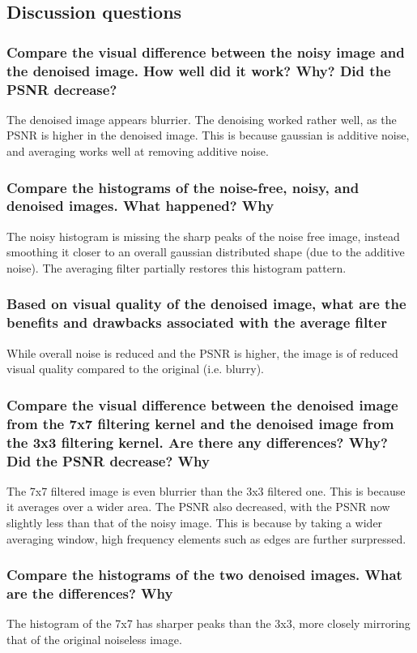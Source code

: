 \documentclass[article, 1.5space, letterpaper, 12pt, oneside, header, footer]{SydeClass}
\begin{document}
\clearpage


\subsection{Discussion questions}

\subsubsection{Compare the visual difference between the noisy image and the denoised image. How well did it
work? Why? Did the PSNR decrease?}
The denoised image appears blurrier. The denoising worked rather well, as the PSNR is higher in the denoised image. This is because gaussian is additive noise, and averaging works well at removing additive noise.

\subsubsection{Compare the histograms of the noise-free, noisy, and denoised images. What happened? Why}
The noisy histogram is missing the sharp peaks of the noise free image, instead smoothing it closer to an overall gaussian distributed shape (due to the additive noise). The averaging filter partially restores this histogram pattern.


\subsubsection{Based on visual quality of the denoised image, what are the benefits and drawbacks associated with
the average filter}
While overall noise is reduced and the PSNR is higher, the image is of reduced visual quality compared to the original (i.e. blurry).


\subsubsection{Compare the visual difference between the denoised image from the 7x7 filtering kernel and the
denoised image from the 3x3 filtering kernel. Are there any differences? Why? Did the PSNR
decrease? Why}
The 7x7 filtered image is even blurrier than the 3x3 filtered one. This is because it averages over a wider area. The PSNR also decreased, with the PSNR now slightly less than that of the noisy image. This is because by taking a wider averaging window, high frequency elements such as edges are further surpressed.


\subsubsection{Compare the histograms of the two denoised images. What are the differences? Why}
The histogram of the 7x7 has sharper peaks than the 3x3, more closely mirroring that of the original noiseless image.
\end{document}
